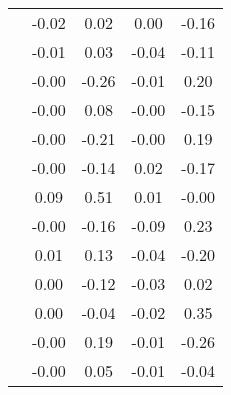 \begin{table}
\begin{tabular}{c|cc|cc|}
\multicolumn{1}{|c|}{} & \multicolumn{1}{|c|}{     -0.02} & \multicolumn{1}{|c|}{      0.02} & \multicolumn{1}{|c|}{      0.00} & \multicolumn{1}{|c|}{     -0.16} \\ 
\multicolumn{1}{|c|}{} & \multicolumn{1}{|c|}{     -0.01} & \multicolumn{1}{|c|}{      0.03} & \multicolumn{1}{|c|}{     -0.04} & \multicolumn{1}{|c|}{     -0.11} \\ 
\multicolumn{1}{|c|}{} & \multicolumn{1}{|c|}{     -0.00} & \multicolumn{1}{|c|}{     -0.26} & \multicolumn{1}{|c|}{     -0.01} & \multicolumn{1}{|c|}{      0.20} \\ 
\multicolumn{1}{|c|}{} & \multicolumn{1}{|c|}{     -0.00} & \multicolumn{1}{|c|}{      0.08} & \multicolumn{1}{|c|}{     -0.00} & \multicolumn{1}{|c|}{     -0.15} \\ 
\multicolumn{1}{|c|}{} & \multicolumn{1}{|c|}{     -0.00} & \multicolumn{1}{|c|}{     -0.21} & \multicolumn{1}{|c|}{     -0.00} & \multicolumn{1}{|c|}{      0.19} \\ 
\multicolumn{1}{|c|}{} & \multicolumn{1}{|c|}{     -0.00} & \multicolumn{1}{|c|}{     -0.14} & \multicolumn{1}{|c|}{      0.02} & \multicolumn{1}{|c|}{     -0.17} \\ 
\multicolumn{1}{|c|}{} & \multicolumn{1}{|c|}{      0.09} & \multicolumn{1}{|c|}{      0.51} & \multicolumn{1}{|c|}{      0.01} & \multicolumn{1}{|c|}{     -0.00} \\ 
\multicolumn{1}{|c|}{} & \multicolumn{1}{|c|}{     -0.00} & \multicolumn{1}{|c|}{     -0.16} & \multicolumn{1}{|c|}{     -0.09} & \multicolumn{1}{|c|}{      0.23} \\ 
\multicolumn{1}{|c|}{} & \multicolumn{1}{|c|}{      0.01} & \multicolumn{1}{|c|}{      0.13} & \multicolumn{1}{|c|}{     -0.04} & \multicolumn{1}{|c|}{     -0.20} \\ 
\multicolumn{1}{|c|}{} & \multicolumn{1}{|c|}{      0.00} & \multicolumn{1}{|c|}{     -0.12} & \multicolumn{1}{|c|}{     -0.03} & \multicolumn{1}{|c|}{      0.02} \\ 
\multicolumn{1}{|c|}{} & \multicolumn{1}{|c|}{      0.00} & \multicolumn{1}{|c|}{     -0.04} & \multicolumn{1}{|c|}{     -0.02} & \multicolumn{1}{|c|}{      0.35} \\ 
\multicolumn{1}{|c|}{} & \multicolumn{1}{|c|}{     -0.00} & \multicolumn{1}{|c|}{      0.19} & \multicolumn{1}{|c|}{     -0.01} & \multicolumn{1}{|c|}{     -0.26} \\ 
\multicolumn{1}{|c|}{} & \multicolumn{1}{|c|}{     -0.00} & \multicolumn{1}{|c|}{      0.05} & \multicolumn{1}{|c|}{     -0.01} & \multicolumn{1}{|c|}{     -0.04} \\ 

\end{tabular}
\end{table}
